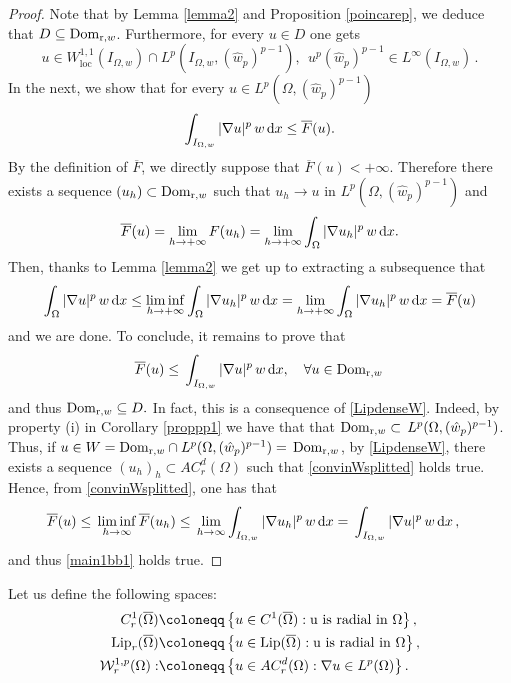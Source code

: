 \documentclass[11pt,leqno]{amsart}
\theoremstyle{remark}
\theoremstyle{definition}
\theoremstyle{definition}
\newcommand{\wstar}{{\hat w}}
\newcommand{\ov}[1]{\overline{#1}}
\def\de{{\rm d}}
\begin{document}
\begin{proof} Note that  by  Lemma \ref{lemma2} and  Proposition \ref{poincarep},  we  deduce that  $D\subseteq {\rm{Dom}}_{{\mathrm r},w}$. Furthermore, for every $u\in D$ one gets
$$
u\in W^{1,1}_{\text {loc}}(I_{\Omega, w})\cap L^{p}(I_{\Omega, w}, (\wstar_{p})^{p-1}),\ \ u^{p}(\wstar_{p})^{p-1}\in L^\infty(I_{\Omega, w})\,.$$ 
In the next, we show that for every $u\in L^{p}(\Omega,(\wstar_{p})^{p-1})$
$$
\displaystyle\int_{I_{\Omega, w}} |\nabla u |^{p}\,w\,\de x\leq\overline{F}(u).
$$
By the definition of  $\overline{F}$, we directly suppose that $\overline{F}(u)<+\infty$. Therefore there exists a sequence $(u_h)\subset {\rm{Dom}}_{{\mathrm r},w}$ such that 
$u_h\to u$ in $L^{p}(\Omega,(\wstar_{p})^{p-1})$ and
$$
\overline{F}(u)=\lim_{h\to +\infty}F(u_h)=\lim_{h\to +\infty}\displaystyle\int_{\Omega} |\nabla u_h |^{p}\,w\,\de x.
$$
Then, thanks to Lemma \ref{lemma2} we get up to extracting a subsequence that
$$
\displaystyle\int_{\Omega} |\nabla u|^{p}\,w\,\de x\leq\liminf_{h\to +\infty}\displaystyle\int_{\Omega} |\nabla u_h |^{p}\,w\,\de x=\lim_{h\to +\infty}\displaystyle\int_{\Omega} |\nabla u_h |^{p}\,w\,\de x=\overline{F}(u)
$$
and we are done. To conclude, it remains to prove that
\begin{equation}\label{main1bb1}
\overline{F}(u)\le\,\displaystyle\int_{I_{\Omega, w}} |\nabla u|^{p}\,w\,\de x,\quad\forall u\in {\rm{Dom}}_{{\mathrm r},w}\,
\end{equation}
and thus ${\rm{Dom}}_{{\mathrm r},w}\subseteq D.$ In fact, this is a consequence of \eqref{LipdenseW}.  Indeed, by  property (i) in Corollary \ref{proppp1}  we have that that ${\rm{Dom}}_{{\mathrm r},w}\subset\,L^{p}(\Omega,(\wstar_{p})^{p-1})$. Thus,
if $u\in W={\rm{Dom}}_{{\mathrm r},w}\cap L^{p}(\Omega,(\hat{w}_{p})^{p-1})=\,{\rm{Dom}}_{{\mathrm r},w}$, by \eqref{LipdenseW}, there exists a sequence $(u_h)_h\subset AC_{r}^{d}(\Omega)$ such that
\eqref{convinWsplitted} holds true. Hence, from \eqref{convinWsplitted}, one has that
\begin{equation*}
\begin{split}
\overline{F}(u)&\le\,\liminf_{h\to\infty}{\overline{F}}(u_h)\le\,\lim_{h\to\infty}\int_{I_{\Omega, w}} |\nabla u_h |^{p}\,w\,\de x= \, \int_{I_{\Omega, w}} |\nabla u|^{p}\,w\,\de x\,,
\end{split}
\end{equation*}
and thus \eqref{main1bb1} holds true.
 \end{proof}
Let us define the following spaces:
\begin{align*}
C_{r}^{1}(\ov{\Omega})&\coloneqq \left\{u\in C^{1}(\ov{\Omega}): \text{u is radial in $\Omega$}\right\},
\\
{\rm Lip}_{r}(\ov{\Omega})&\coloneqq \left\{u\in {\rm Lip}(\ov{\Omega}): \text{u is radial in $\Omega$}\right\},
\\
{\mathcal{W}}^{1,p}_r(\Omega):&\coloneqq\left\{u\in AC_{r}^{d}(\Omega): \nabla u\in L^{p}(\Omega)\right\}.
\end{align*}
\end{document}
